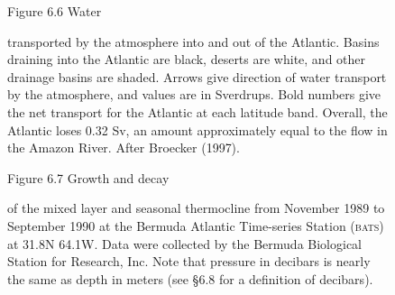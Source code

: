 \begin{figure}[b!]
\vspace{-3ex}
\footnotesize
Figure 6.6 Water \rule{0pt}{3ex} transported
by the atmosphere into and out of the
Atlantic. Basins draining into the Atlantic are black, deserts are
white, and other drainage basins are shaded. Arrows give direction of
water transport by the atmosphere, and values are in Sverdrups. Bold
numbers give the net transport for the Atlantic at each latitude
band. Overall, the Atlantic loses 0.32 Sv, an amount approximately
equal to the flow in the Amazon River. After Broecker (1997).
\label{fig:BroeckerPlot}
\end{figure}

\begin{figure}[t!]
\footnotesize
Figure 6.7 Growth and decay \rule{0mm}{4ex} of the mixed
layer and seasonal
thermocline from November 1989 to
September 1990 at the Bermuda Atlantic Time-series Station
(\textsc{bats}) at 31.8\degrees N 64.1\degrees W. Data were collected
by the Bermuda Biological Station for Research, Inc. Note that
pressure in decibars is nearly the same as depth in meters (see \S 6.8
for a definition of decibars).
\label{fig:seasonalthermo}
\vspace{-4ex}
\end{figure}

